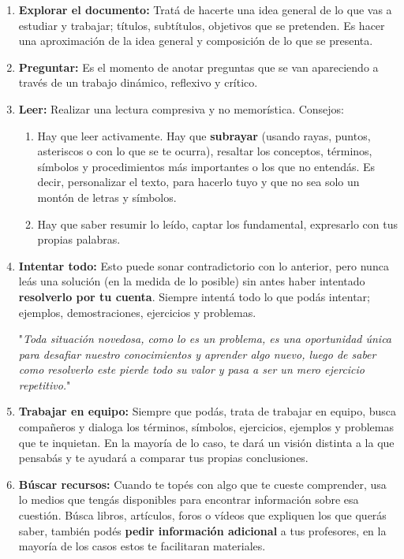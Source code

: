\begin{enumerate}
    \item \textbf{Explorar el documento:}
    Tratá de hacerte una idea general de lo que vas a estudiar y trabajar; títulos, subtítulos, objetivos que se pretenden.
    Es hacer una aproximación de la idea general y composición de lo que se presenta.
    \item \textbf{Preguntar:}
    Es el momento de anotar preguntas que se van apareciendo a través de un trabajo dinámico, reflexivo y crítico.
    \item \textbf{Leer:}
    Realizar una lectura compresiva y no memorística.
    Consejos:
    \begin{enumerate}
        \item Hay que leer activamente.
        Hay que \textbf{subrayar} (usando rayas, puntos, asteriscos o con lo que se te ocurra), resaltar los conceptos, términos, símbolos y procedimientos más importantes o los que no entendás.
        Es decir, personalizar el texto, para hacerlo tuyo y que no sea solo un montón de letras y símbolos.
        \item Hay que saber resumir lo leído, captar los fundamental, expresarlo con tus propias palabras.
    \end{enumerate}
    \item \textbf{Intentar todo:} Esto puede sonar contradictorio con lo anterior, pero nunca leás una solución (en la medida de lo posible) sin antes haber intentado \textbf{resolverlo por tu cuenta}.
    Siempre intentá todo lo que podás intentar; ejemplos, demostraciones, ejercicios y problemas.
    \begin{center}
        "\textit{Toda situación novedosa, como lo es un problema, es una oportunidad única para desafiar nuestro conocimientos y aprender algo nuevo, luego de saber como resolverlo este pierde todo su valor y pasa a ser un mero ejercicio repetitivo.}"
    \end{center}
    \item \textbf{Trabajar en equipo:} Siempre que podás, trata de trabajar en equipo, busca compañeros y dialoga los términos, símbolos, ejercicios, ejemplos y problemas que te inquietan.
    En la mayoría de lo caso, te dará un visión distinta a la que pensabás y te ayudará a comparar tus propias conclusiones.
    \item \textbf{Búscar recursos:} Cuando te topés con algo que te cueste comprender, usa lo medios que tengás disponibles para encontrar información sobre esa cuestión.
    Búsca libros, artículos, foros o vídeos que expliquen los que querás saber, también podés \textbf{pedir información adicional} a tus profesores, en la mayoría de los casos estos te facilitaran materiales.
\end{enumerate}

